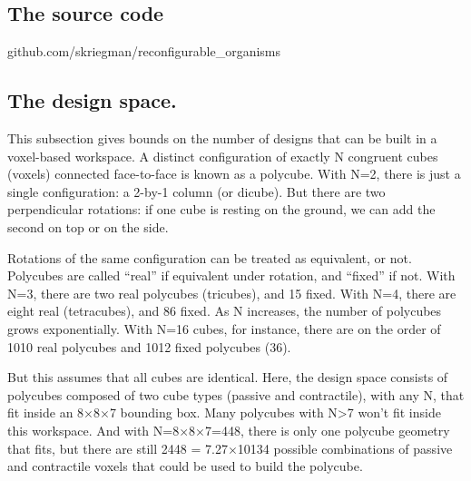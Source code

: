 



\subsection*{The source code}  

github.com/skriegman/reconfigurable\_organisms


\subsection*{The design space.}

This subsection gives bounds on the number of designs that can be built in a voxel-based workspace.
A distinct configuration of exactly N congruent cubes (voxels) connected face-to-face is known as a polycube. With N=2, there is just a single configuration: a 2-by-1 column (or dicube). But there are two perpendicular rotations: if one cube is resting on the ground, we can add the second on top or on the side. 

Rotations of the same configuration can be treated as equivalent, or not. Polycubes are called ``real'' if equivalent under rotation, and ``fixed'' if not. With N=3, there are two real polycubes (tricubes), and 15 fixed. With N=4, there are eight real (tetracubes), and 86 fixed. As N increases, the number of polycubes grows exponentially. With N=16 cubes, for instance, there are on the order of 1010 real polycubes and 1012 fixed polycubes (36). 

But this assumes that all cubes are identical. Here, the design space consists of polycubes composed of two cube types (passive and contractile), with any N, that fit inside an 8{$\times$}8{$\times$}7 bounding box. Many polycubes with N>7 won't fit inside this workspace. And with N=8{$\times$}8{$\times$}7=448, there is only one polycube geometry that fits, but there are still 2448 = 7.27{$\times$}10134 possible combinations of passive and contractile voxels that could be used to build the polycube.

